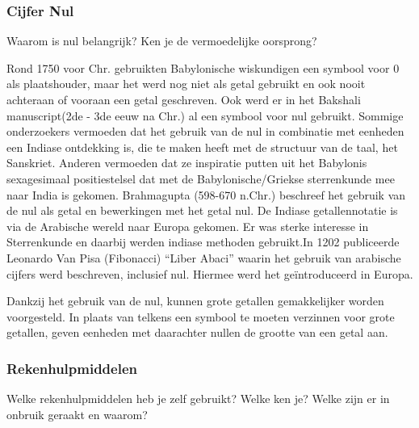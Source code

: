\documentclass[../main.tex]{subfiles}
\begin{document}
\subsubsection{Cijfer Nul}
\begin{question}
Waarom is nul belangrijk? Ken je de vermoedelijke oorsprong?
\end{question}

\begin{solution}
Rond 1750 voor Chr. gebruikten Babylonische wiskundigen een symbool voor 0 als plaatshouder, maar het werd nog niet als getal gebruikt en ook nooit achteraan of vooraan een getal geschreven. Ook werd er in het Bakshali manuscript(2de - 3de eeuw na Chr.)  al een symbool voor nul gebruikt. Sommige onderzoekers vermoeden dat het gebruik  van de nul in combinatie met eenheden een Indiase ontdekking is, die te maken heeft met de structuur van de taal, het Sanskriet. Anderen vermoeden dat ze inspiratie putten uit het Babylonis sexagesimaal positiestelsel dat met de Babylonische/Griekse sterrenkunde mee naar India is gekomen. Brahmagupta (598-670 n.Chr.) beschreef het gebruik van de nul als getal en bewerkingen met het getal nul. De Indiase getallennotatie is via de Arabische wereld naar Europa gekomen. Er was sterke interesse in Sterrenkunde en daarbij werden indiase methoden gebruikt.In 1202 publiceerde Leonardo Van Pisa (Fibonacci) ``Liber Abaci'' waarin het gebruik van arabische cijfers werd beschreven, inclusief nul. Hiermee werd het ge\"introduceerd in Europa.

Dankzij het gebruik van de nul, kunnen grote getallen gemakkelijker worden voorgesteld. In plaats van telkens een symbool te moeten verzinnen voor grote getallen, geven eenheden met daarachter nullen de grootte van een getal aan.

\end{solution}

\subsubsection{Rekenhulpmiddelen}
\begin{question}
Welke rekenhulpmiddelen heb je zelf gebruikt? Welke ken je? Welke zijn er in onbruik geraakt en waarom?
\end{question}
\end{document}
